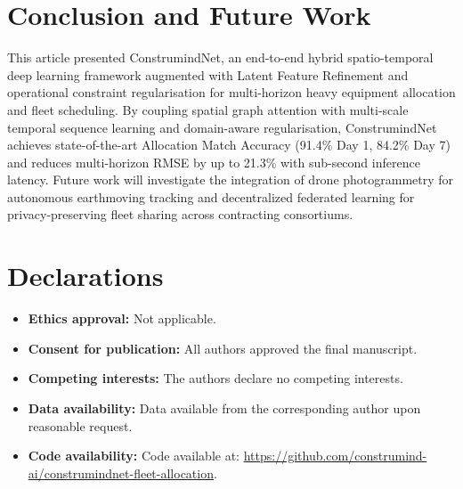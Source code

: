 \documentclass[11pt,a4paper]{article}
\begin{document}
\section{Conclusion and Future Work}\label{sec:concl}
This article presented ConstrumindNet, an end-to-end hybrid spatio-temporal deep learning framework augmented with Latent Feature Refinement and operational constraint regularisation for multi-horizon heavy equipment allocation and fleet scheduling. By coupling spatial graph attention with multi-scale temporal sequence learning and domain-aware regularisation, ConstrumindNet achieves state-of-the-art Allocation Match Accuracy (91.4\% Day 1, 84.2\% Day 7) and reduces multi-horizon RMSE by up to 21.3\% with sub-second inference latency. Future work will investigate the integration of drone photogrammetry for autonomous earthmoving tracking and decentralized federated learning for privacy-preserving fleet sharing across contracting consortiums.

\section*{Declarations}
\begin{itemize}
\item \textbf{Ethics approval:} Not applicable.
\item \textbf{Consent for publication:} All authors approved the final manuscript.
\item \textbf{Competing interests:} The authors declare no competing interests.
\item \textbf{Data availability:} Data available from the corresponding author upon reasonable request.
\item \textbf{Code availability:} Code available at: \url{https://github.com/construmind-ai/construmindnet-fleet-allocation}.
\end{itemize}



\end{document}
